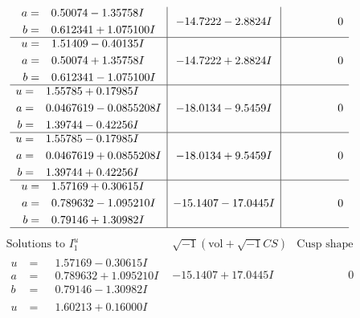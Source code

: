 \documentclass[1p]{elsarticle_modified}
\theoremstyle{definition}
\newcommand{\I}{\sqrt{-1}}
\begin{document}
$$\begin{array}{c|c|c}
\begin{aligned}
a &= \phantom{-}0.50074 - 1.35758 I \\
b &= \phantom{-}0.612341 + 1.075100 I\end{aligned}
 & -14.7222 - 2.8824 I & \phantom{-0.000000 } 0 \\ \hline\begin{aligned}
u &= \phantom{-}1.51409 - 0.40135 I \\
a &= \phantom{-}0.50074 + 1.35758 I \\
b &= \phantom{-}0.612341 - 1.075100 I\end{aligned}
 & -14.7222 + 2.8824 I & \phantom{-0.000000 } 0 \\ \hline\begin{aligned}
u &= \phantom{-}1.55785 + 0.17985 I \\
a &= \phantom{-}0.0467619 - 0.0855208 I \\
b &= \phantom{-}1.39744 - 0.42256 I\end{aligned}
 & -18.0134 - 9.5459 I & \phantom{-0.000000 } 0 \\ \hline\begin{aligned}
u &= \phantom{-}1.55785 - 0.17985 I \\
a &= \phantom{-}0.0467619 + 0.0855208 I \\
b &= \phantom{-}1.39744 + 0.42256 I\end{aligned}
 & -18.0134 + 9.5459 I & \phantom{-0.000000 } 0 \\ \hline\begin{aligned}
u &= \phantom{-}1.57169 + 0.30615 I \\
a &= \phantom{-}0.789632 - 1.095210 I \\
b &= \phantom{-}0.79146 + 1.30982 I\end{aligned}
 & -15.1407 - 17.0445 I & \phantom{-0.000000 } 0\\
 \hline 
 \end{array}$$\newpage$$\begin{array}{c|c|c}  
\text{Solutions to }I^u_{1}& \I (\text{vol} + \sqrt{-1}CS) & \text{Cusp shape}\\
 \hline 
\begin{aligned}
u &= \phantom{-}1.57169 - 0.30615 I \\
a &= \phantom{-}0.789632 + 1.095210 I \\
b &= \phantom{-}0.79146 - 1.30982 I\end{aligned}
 & -15.1407 + 17.0445 I & \phantom{-0.000000 } 0 \\ \hline\begin{aligned}
u &= \phantom{-}1.60213 + 0.16000 I \\

\end{aligned}
\end{array}$$
\end{document}
